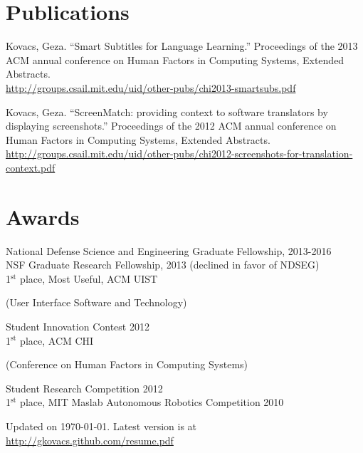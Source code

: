 \documentclass[margin,line]{resume}
\begin{document}
\begin{resume}


\section{\mysidestyle Publications}

Kovacs, Geza. ``Smart Subtitles for Language Learning.'' Proceedings of the 2013 ACM annual conference on Human Factors in Computing Systems, Extended Abstracts.\\
\url{http://groups.csail.mit.edu/uid/other-pubs/chi2013-smartsubs.pdf}

Kovacs, Geza. ``ScreenMatch: providing context to software translators by displaying screenshots.'' Proceedings of the 2012 ACM annual conference on Human Factors in Computing Systems, Extended Abstracts.\\
\url{http://groups.csail.mit.edu/uid/other-pubs/chi2012-screenshots-for-translation-context.pdf}

\section{\mysidestyle Awards}

National Defense Science and Engineering Graduate Fellowship, 2013-2016\\
NSF Graduate Research Fellowship, 2013 (declined in favor of NDSEG) \\
1$^{\textrm{st}}$ place, Most Useful, ACM UIST \begin{small}(User Interface Software and Technology)\end{small} Student Innovation Contest 2012\\
1$^{\textrm{st}}$ place, ACM CHI \begin{small}(Conference on Human Factors in Computing Systems)\end{small} Student Research Competition 2012\\
1$^{\textrm{st}}$ place, MIT Maslab Autonomous Robotics Competition 2010

\vspace{-3mm}

\begin{small}
\begin{center}
Updated on \today. Latest version is at \url{http://gkovacs.github.com/resume.pdf}
\end{center}
\end{small}

\end{resume}
\end{document}
